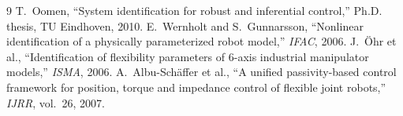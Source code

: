 \documentclass[10pt,twocolumn]{article}
\begin{document}

\begin{thebibliography}{9}
 T.~Oomen, ``System identification for robust and inferential control,'' Ph.D. thesis, TU Eindhoven, 2010.
 E.~Wernholt and S.~Gunnarsson, ``Nonlinear identification of a physically parameterized robot model,'' \emph{IFAC}, 2006.
 J.~\"Ohr et al., ``Identification of flexibility parameters of 6-axis industrial manipulator models,'' \emph{ISMA}, 2006.
 A.~Albu-Sch\"affer et al., ``A unified passivity-based control framework for position, torque and impedance control of flexible joint robots,'' \emph{IJRR}, vol.~26, 2007.
\end{thebibliography}
\end{document}
